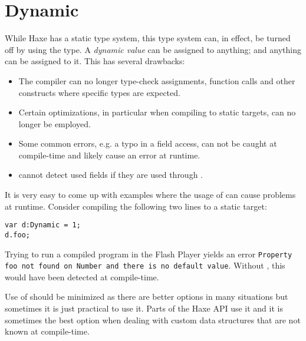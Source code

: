 {\section{Dynamic}
\label{types-dynamic}

While Haxe has a static type system, this type system can, in effect, be turned off by using the  type. A \emph{dynamic value} can be assigned to anything; and anything can be assigned to it. This has several drawbacks:

\begin{itemize}
	\item The compiler can no longer type-check assignments, function calls and other constructs where specific types are expected.
	\item Certain optimizations, in particular when compiling to static targets, can no longer be employed.
	\item Some common errors, e.g. a typo in a field access, can not be caught at compile-time and likely cause an error at runtime.
	\item {} cannot detect used fields if they are used through .
\end{itemize}
It is very easy to come up with examples where the usage of  can cause problems at runtime. Consider compiling the following two lines to a static target:

\begin{lstlisting}
var d:Dynamic = 1;
d.foo;
\end{lstlisting}

Trying to run a compiled program in the Flash Player yields an error \texttt{Property foo not found on Number and there is no default value}. Without , this would have been detected at compile-time.


Use of  should be minimized as there are better options in many situations but sometimes it is just practical to use it. Parts of the Haxe  API use it and it is sometimes the best option when dealing with custom data structures that are not known at compile-time.

}
